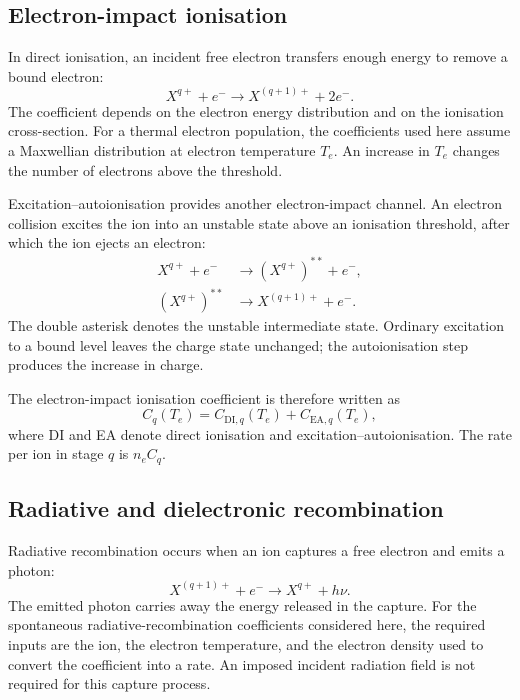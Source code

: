\subsection{Electron-impact ionisation}

In direct ionisation, an incident free electron transfers enough energy to
remove a bound electron:
\begin{equation}
 X^{q+}+e^-\longrightarrow X^{(q+1)+}+2e^-.
 \label{eq:ion-direct}
\end{equation}
The coefficient depends on the electron energy distribution and on the
ionisation cross-section. For a thermal electron population, the coefficients
used here assume a Maxwellian distribution at electron temperature $T_e$.
An increase in $T_e$ changes the number of electrons above the threshold.

Excitation--autoionisation provides another electron-impact channel. An
electron collision excites the ion into an unstable state above an ionisation
threshold, after which the ion ejects an electron:
\begin{align}
 X^{q+}+e^- &\longrightarrow (X^{q+})^{**}+e^-,
 \\
 (X^{q+})^{**} &\longrightarrow X^{(q+1)+}+e^-.
\end{align}
The double asterisk denotes the unstable intermediate state. Ordinary
excitation to a bound level leaves the charge state unchanged; the
autoionisation step produces the increase in charge.

The electron-impact ionisation coefficient is therefore written as
\begin{equation}
 C_q(T_e)=C_{\mathrm{DI},q}(T_e)+C_{\mathrm{EA},q}(T_e),
 \label{eq:ion-electron-total}
\end{equation}
where DI and EA denote direct ionisation and excitation--autoionisation.
The rate per ion in stage $q$ is $n_e C_q$.

\subsection{Radiative and dielectronic recombination}

Radiative recombination occurs when an ion captures a free electron and emits
a photon:
\begin{equation}
 X^{(q+1)+}+e^-\longrightarrow X^{q+}+h\nu.
 \label{eq:ion-rr}
\end{equation}
The emitted photon carries away the energy released in the capture.
For the spontaneous radiative-recombination coefficients considered here,
the required inputs are the ion, the electron temperature, and the electron
density used to convert the coefficient into a rate. An imposed incident
radiation field is not required for this capture process.

